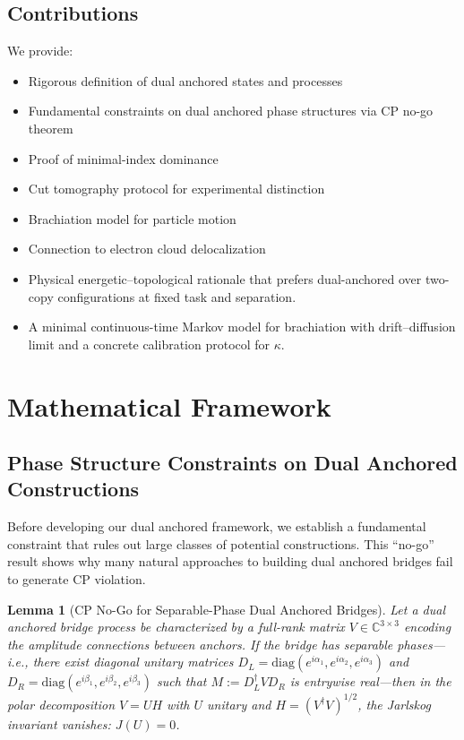 \documentclass[11pt]{article}
\theoremstyle{plain}
\newtheorem{lemma}[theorem]{Lemma}
\theoremstyle{definition}
\begin{document}
\subsection{Contributions}
We provide:
\begin{itemize}
  \item Rigorous definition of dual anchored states and processes
  \item Fundamental constraints on dual anchored phase structures via CP no-go theorem
  \item Proof of minimal-index dominance
  \item Cut tomography protocol for experimental distinction
  \item Brachiation model for particle motion
  \item Connection to electron cloud delocalization
  \item Physical energetic--topological rationale that prefers dual-anchored over two-copy configurations at fixed task and separation.
  \item A minimal continuous-time Markov model for brachiation with drift--diffusion limit and a concrete calibration protocol for $\kappa$.

\end{itemize}

\section{Mathematical Framework}
\label{sec:framework}
\subsection{Phase Structure Constraints on Dual Anchored Constructions}\label{subsec:cp-nogo}

Before developing our dual anchored framework, we establish a fundamental constraint that rules out large classes of potential constructions. This ``no-go'' result shows why many natural approaches to building dual anchored bridges fail to generate CP violation.

\begin{lemma}[CP No-Go for Separable-Phase Dual Anchored Bridges]\label{lem:cp-nogo}
  Let a dual anchored bridge process be characterized by a \emph{full-rank} matrix $V \in \mathbb{C}^{3\times 3}$ encoding the amplitude connections between anchors. If the bridge has separable phases—i.e., there exist diagonal unitary matrices $D_L=\mathrm{diag}(e^{i\alpha_1},e^{i\alpha_2},e^{i\alpha_3})$ and $D_R=\mathrm{diag}(e^{i\beta_1},e^{i\beta_2},e^{i\beta_3})$ such that $M:=D_L^\dagger V D_R$ is entrywise real—then in the polar decomposition $V=UH$ with $U$ unitary and $H=(V^\dagger V)^{1/2}$, the Jarlskog invariant vanishes: $J(U)=0$.
\end{lemma}
\end{document}
